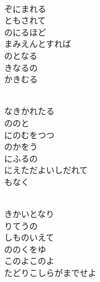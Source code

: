 \documentclass[10pt,b5j]{tarticle} %
\begin{document}
\vspace{1.5em} %
\newcommand{\linespace}{0.5em} %
\newcommand{\blocksize}{0.5\hsize} %
\newcommand{\itemmargin}{6em} %
\begin{enumerate} %
    \setlength{\itemindent}{\itemmargin} %
    \begin{minipage}[c]{\blocksize}
    
        \vspace{\linespace}
        \item~\\
        ぞにまれる\\
        ともされて\\
        のにるほど\\
        まみえんとすれば\\
        のとなる\\
        きなるの\\
        かきむる
        
        \vspace{\linespace}
        \item~\\
        なきかれたる\\
        ののと\\
        にのむをつつ\\
        のかをう\\
        にふるの\\
        にえただよいしだれて\\
        もなく
        
        \vspace{\linespace}
        \item~\\
        きかいとなり\\
        りてうの\\
        しものいえて\\
        ののくをゆ\\
        このよこのよ\\
        たどりこしらがまでせよ
        

\end{minipage}
\end{enumerate}
\end{document}
